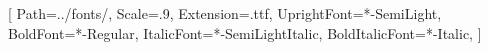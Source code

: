 \usepackage{fontspec}

\setmonofont{CascadiaMono}[
    Path=../fonts/,
    Scale=.9,
    Extension=.ttf,
    UprightFont=*-SemiLight,
    BoldFont=*-Regular,
    ItalicFont=*-SemiLightItalic,
    BoldItalicFont=*-Italic,
]
